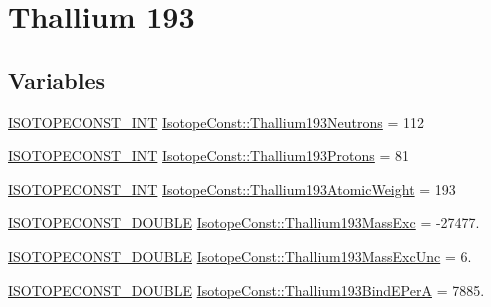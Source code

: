 \hypertarget{group___isotope_const-_thallium-_tl193}{}\section{Thallium 193}
\label{group___isotope_const-_thallium-_tl193}
\subsection*{Variables}
\begin{DoxyCompactItemize}
\item 
\mbox{\hyperlink{group___isotope_const-_macros_ga5f18360b3e99483a35c32d789e62621c}{I\+S\+O\+T\+O\+P\+E\+C\+O\+N\+S\+T\+\_\+\+I\+NT}} \mbox{\hyperlink{group___isotope_const-_thallium-_tl193_gaac469e314f617a8990f95e6007405b11}{Isotope\+Const\+::\+Thallium193\+Neutrons}} = 112
\item 
\mbox{\hyperlink{group___isotope_const-_macros_ga5f18360b3e99483a35c32d789e62621c}{I\+S\+O\+T\+O\+P\+E\+C\+O\+N\+S\+T\+\_\+\+I\+NT}} \mbox{\hyperlink{group___isotope_const-_thallium-_tl193_gac3639f5382ff514bce082143962c9a58}{Isotope\+Const\+::\+Thallium193\+Protons}} = 81
\item 
\mbox{\hyperlink{group___isotope_const-_macros_ga5f18360b3e99483a35c32d789e62621c}{I\+S\+O\+T\+O\+P\+E\+C\+O\+N\+S\+T\+\_\+\+I\+NT}} \mbox{\hyperlink{group___isotope_const-_thallium-_tl193_ga3d76a022da7aba9bbb983e5ed90b9e93}{Isotope\+Const\+::\+Thallium193\+Atomic\+Weight}} = 193
\item 
\mbox{\hyperlink{group___isotope_const-_macros_ga8f45a7272ce02c0b4c65c44636ed719a}{I\+S\+O\+T\+O\+P\+E\+C\+O\+N\+S\+T\+\_\+\+D\+O\+U\+B\+LE}} \mbox{\hyperlink{group___isotope_const-_thallium-_tl193_ga2b9ce2a06f58307f7a40832e3df951a9}{Isotope\+Const\+::\+Thallium193\+Mass\+Exc}} = -\/27477.
\item 
\mbox{\hyperlink{group___isotope_const-_macros_ga8f45a7272ce02c0b4c65c44636ed719a}{I\+S\+O\+T\+O\+P\+E\+C\+O\+N\+S\+T\+\_\+\+D\+O\+U\+B\+LE}} \mbox{\hyperlink{group___isotope_const-_thallium-_tl193_gafb11d225dbb903a3abae2e638d4abfcc}{Isotope\+Const\+::\+Thallium193\+Mass\+Exc\+Unc}} = 6.
\item 
\mbox{\hyperlink{group___isotope_const-_macros_ga8f45a7272ce02c0b4c65c44636ed719a}{I\+S\+O\+T\+O\+P\+E\+C\+O\+N\+S\+T\+\_\+\+D\+O\+U\+B\+LE}} \mbox{\hyperlink{group___isotope_const-_thallium-_tl193_ga4d897c8702120f636f71867a9060ea8b}{Isotope\+Const\+::\+Thallium193\+Bind\+E\+PerA}} = 7885.
\item 

\end{DoxyCompactItemize}
